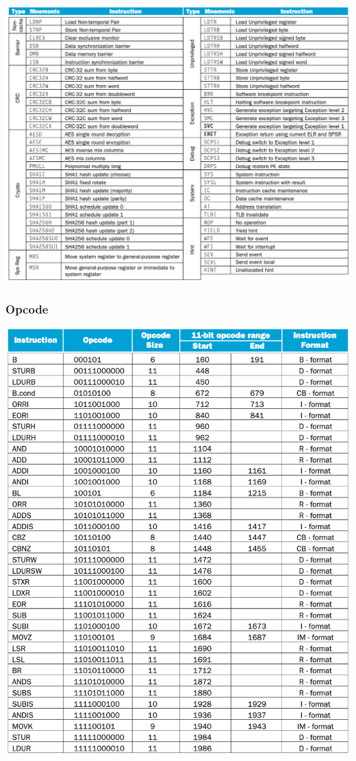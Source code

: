 \documentclass[a4paper]{scrartcl}
\begin{document}
        \centering\includegraphics[scale=0.26]{arm_assembler4.png}
        \subsubsection{Opcode}
        \centering\includegraphics[scale=0.26]{opcode.png}
\end{document}

